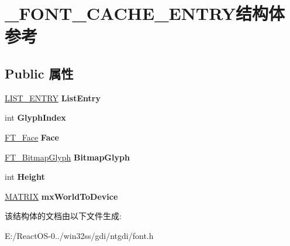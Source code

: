 \hypertarget{struct___f_o_n_t___c_a_c_h_e___e_n_t_r_y}{}\section{\+\_\+\+F\+O\+N\+T\+\_\+\+C\+A\+C\+H\+E\+\_\+\+E\+N\+T\+R\+Y结构体 参考}
\label{struct___f_o_n_t___c_a_c_h_e___e_n_t_r_y}
\subsection*{Public 属性}
\begin{DoxyCompactItemize}
\item 
\mbox{\label{struct___f_o_n_t___c_a_c_h_e___e_n_t_r_y_a3e91a63588ca012f99b2ebb1dfdc9856}} 
\hyperlink{struct___l_i_s_t___e_n_t_r_y}{L\+I\+S\+T\+\_\+\+E\+N\+T\+RY} {\bfseries List\+Entry}
\item 
\mbox{\label{struct___f_o_n_t___c_a_c_h_e___e_n_t_r_y_ab6bc1a4e86537018e4d2b420a1de73f8}} 
int {\bfseries Glyph\+Index}
\item 
\mbox{\label{struct___f_o_n_t___c_a_c_h_e___e_n_t_r_y_ac6a89e3b64fac49466cee141f4fa86e2}} 
\hyperlink{struct_f_t___face_rec__}{F\+T\+\_\+\+Face} {\bfseries Face}
\item 
\mbox{\label{struct___f_o_n_t___c_a_c_h_e___e_n_t_r_y_a346bd54b41d8abc7c41c55f443d60745}} 
\hyperlink{struct_f_t___bitmap_glyph_rec__}{F\+T\+\_\+\+Bitmap\+Glyph} {\bfseries Bitmap\+Glyph}
\item 
\mbox{\label{struct___f_o_n_t___c_a_c_h_e___e_n_t_r_y_a0bf0d6695f3b31d4f6ade43c2d4c6b64}} 
int {\bfseries Height}
\item 
\mbox{\label{struct___f_o_n_t___c_a_c_h_e___e_n_t_r_y_a964a597552c72a13c4c331bc40567fd0}} 
\hyperlink{struct_m_a_t_r_i_x}{M\+A\+T\+R\+IX} {\bfseries mx\+World\+To\+Device}
\end{DoxyCompactItemize}


该结构体的文档由以下文件生成\+:\begin{DoxyCompactItemize}
\item 
E\+:/\+React\+O\+S-\/0../win32ss/gdi/ntgdi/font.\+h\end{DoxyCompactItemize}
